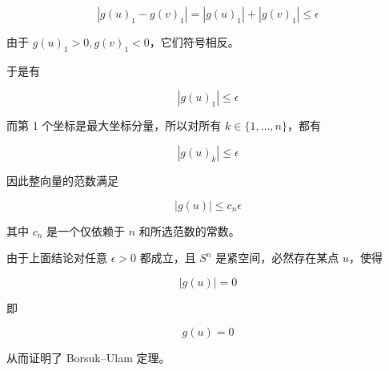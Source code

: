 $$
|g(u)_1 - g(v)_1| = |g(u)_1| + |g(v)_1| \leq \epsilon
$$

由于 $g(u)_1 > 0, g(v)_1 < 0$，它们符号相反。

于是有

$$
|g(u)_1| \leq \epsilon
$$

而第 1 个坐标是最大坐标分量，所以对所有 $k \in \{1, \dots, n\}$，都有

$$
|g(u)_k| \leq \epsilon
$$

因此整向量的范数满足

$$
|g(u)| \leq c_n \epsilon
$$

其中 $c_n$ 是一个仅依赖于 $n$ 和所选范数的常数。

由于上面结论对任意 $\epsilon > 0$ 都成立，且 $S^n$ 是紧空间，必然存在某点 $u$，使得

$$
|g(u)| = 0
$$

即

$$
g(u) = 0
$$

从而证明了 Borsuk–Ulam 定理。
